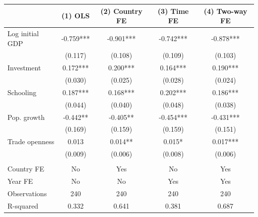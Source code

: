 \begin{tabular}{lcccc}
\toprule
 & (1) OLS & (2) Country FE & (3) Time FE & (4) Two-way FE \\
\midrule
Log initial GDP & -0.759*** & -0.901*** & -0.742*** & -0.878*** \\
 & (0.117) & (0.108) & (0.109) & (0.103) \\
Investment & 0.172*** & 0.200*** & 0.164*** & 0.190*** \\
 & (0.030) & (0.025) & (0.028) & (0.024) \\
Schooling & 0.187*** & 0.168*** & 0.202*** & 0.186*** \\
 & (0.044) & (0.040) & (0.048) & (0.038) \\
Pop. growth & -0.442** & -0.405** & -0.454*** & -0.431*** \\
 & (0.169) & (0.159) & (0.159) & (0.151) \\
Trade openness & 0.013 & 0.014** & 0.015* & 0.017*** \\
 & (0.009) & (0.006) & (0.008) & (0.006) \\
 &  &  &  &  \\
Country FE & No & Yes & No & Yes \\
Year FE & No & No & Yes & Yes \\
Observations & 240 & 240 & 240 & 240 \\
R-squared & 0.332 & 0.641 & 0.381 & 0.687 \\
\bottomrule
\end{tabular}
